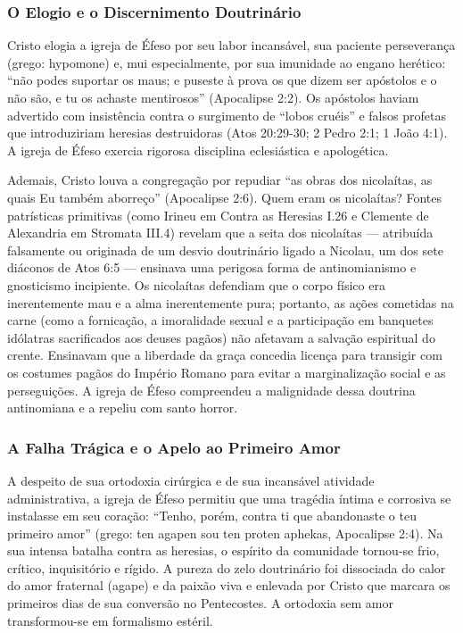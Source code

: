 \subsubsection*{O Elogio e o Discernimento Doutrinário}
Cristo elogia a igreja de Éfeso por seu labor incansável, sua paciente perseverança (grego: hypomone) e, mui especialmente, por sua imunidade ao engano herético: ``não podes suportar os maus; e puseste à prova os que dizem ser apóstolos e o não são, e tu os achaste mentirosos'' (Apocalipse 2:2). Os apóstolos haviam advertido com insistência contra o surgimento de ``lobos cruéis'' e falsos profetas que introduziriam heresias destruidoras (Atos 20:29-30; 2 Pedro 2:1; 1 João 4:1). A igreja de Éfeso exercia rigorosa disciplina eclesiástica e apologética.

Ademais, Cristo louva a congregação por repudiar ``as obras dos nicolaítas, as quais Eu também aborreço'' (Apocalipse 2:6). Quem eram os nicolaítas? Fontes patrísticas primitivas (como Irineu em Contra as Heresias I.26 e Clemente de Alexandria em Stromata III.4) revelam que a seita dos nicolaítas — atribuída falsamente ou originada de um desvio doutrinário ligado a Nicolau, um dos sete diáconos de Atos 6:5 — ensinava uma perigosa forma de antinomianismo e gnosticismo incipiente. Os nicolaítas defendiam que o corpo físico era inerentemente mau e a alma inerentemente pura; portanto, as ações cometidas na carne (como a fornicação, a imoralidade sexual e a participação em banquetes idólatras sacrificados aos deuses pagãos) não afetavam a salvação espiritual do crente. Ensinavam que a liberdade da graça concedia licença para transigir com os costumes pagãos do Império Romano para evitar a marginalização social e as perseguições. A igreja de Éfeso compreendeu a malignidade dessa doutrina antinomiana e a repeliu com santo horror.


\subsubsection*{A Falha Trágica e o Apelo ao Primeiro Amor}
A despeito de sua ortodoxia cirúrgica e de sua incansável atividade administrativa, a igreja de Éfeso permitiu que uma tragédia íntima e corrosiva se instalasse em seu coração: ``Tenho, porém, contra ti que abandonaste o teu primeiro amor'' (grego: ten agapen sou ten proten aphekas, Apocalipse 2:4). Na sua intensa batalha contra as heresias, o espírito da comunidade tornou-se frio, crítico, inquisitório e rígido. A pureza do zelo doutrinário foi dissociada do calor do amor fraternal (agape) e da paixão viva e enlevada por Cristo que marcara os primeiros dias de sua conversão no Pentecostes. A ortodoxia sem amor transformou-se em formalismo estéril.

